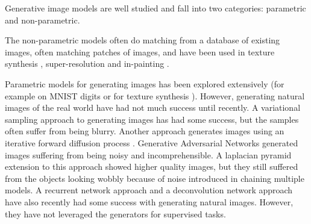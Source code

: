Generative image models are well studied and fall into two categories: parametric and non-parametric.

The non-parametric models often do matching from a database of existing images, often matching patches of images, and have been used in texture synthesis \citep{efros1999texture}, super-resolution \citep{freeman2002example} and in-painting \citep{hays2007scene}.

Parametric models for generating images has been explored extensively (for example on MNIST digits or for texture synthesis \citep{portilla2000parametric}). 
However, generating natural images of the real world have had not much success until recently. A variational sampling approach to generating images \citep{kingma2013auto} has had some success, but the samples often suffer from being blurry. Another approach generates images using an iterative forward diffusion process \citep{sohl2015deep}. Generative Adversarial Networks \citep{Goodfellow2014} generated images suffering from being noisy and incomprehensible. A laplacian pyramid extension to this approach \citep{denton2015deep} showed higher quality images, but they still suffered from the objects looking wobbly because of noise introduced in chaining multiple models. A recurrent network approach \citep{gregor2015draw} and a deconvolution network approach \citep{dosovitskiy2014learning} have also recently had some success with generating natural images. However, they have not leveraged the generators for supervised tasks.







    
